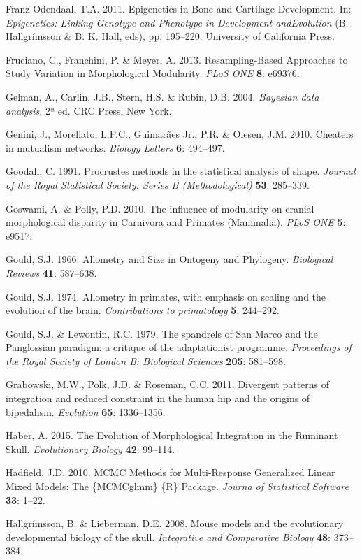 \documentclass[12pt,twoside]{report}
\begin{document}
Franz-Odendaal, T.A. 2011. Epigenetics in Bone and Cartilage
Development. In: \emph{Epigenetics: Linking Genotype and Phenotype in
Development andEvolution} (B. Hallgrímsson \& B. K. Hall, eds), pp.
195--220. University of California Press.

Fruciano, C., Franchini, P. \& Meyer, A. 2013. Resampling-Based
Approaches to Study Variation in Morphological Modularity. \emph{PLoS
ONE} \textbf{8}: e69376.

Gelman, A., Carlin, J.B., Stern, H.S. \& Rubin, D.B. 2004.
\emph{Bayesian data analysis}, 2ª ed. CRC Press, New York.

Genini, J., Morellato, L.P.C., Guimarães Jr., P.R. \& Olesen, J.M. 2010.
Cheaters in mutualism networks. \emph{Biology Letters} \textbf{6}:
494--497.

Goodall, C. 1991. Procrustes methods in the statistical analysis of
shape. \emph{Journal of the Royal Statistical Society. Series B
(Methodological)} \textbf{53}: 285--339.

Goswami, A. \& Polly, P.D. 2010. The influence of modularity on cranial
morphological disparity in Carnivora and Primates (Mammalia). \emph{PLoS
ONE} \textbf{5}: e9517.

Gould, S.J. 1966. Allometry and Size in Ontogeny and Phylogeny.
\emph{Biological Reviews} \textbf{41}: 587--638.

Gould, S.J. 1974. Allometry in primates, with emphasis on scaling and
the evolution of the brain. \emph{Contributions to primatology}
\textbf{5}: 244--292.

Gould, S.J. \& Lewontin, R.C. 1979. The spandrels of San Marco and the
Panglossian paradigm: a critique of the adaptationist programme.
\emph{Proceedings of the Royal Society of London B: Biological Sciences}
\textbf{205}: 581--598.

Grabowski, M.W., Polk, J.D. \& Roseman, C.C. 2011. Divergent patterns of
integration and reduced constraint in the human hip and the origins of
bipedalism. \emph{Evolution} \textbf{65}: 1336--1356.

Haber, A. 2015. The Evolution of Morphological Integration in the
Ruminant Skull. \emph{Evolutionary Biology} \textbf{42}: 99--114.

Hadfield, J.D. 2010. MCMC Methods for Multi-Response Generalized Linear
Mixed Models: The \{MCMCglmm\} \{R\} Package. \emph{Journa of
Statistical Software} \textbf{33}: 1--22.

Hallgrímsson, B. \& Lieberman, D.E. 2008. Mouse models and the
evolutionary developmental biology of the skull. \emph{Integrative and
Comparative Biology} \textbf{48}: 373--384.
\end{document}
